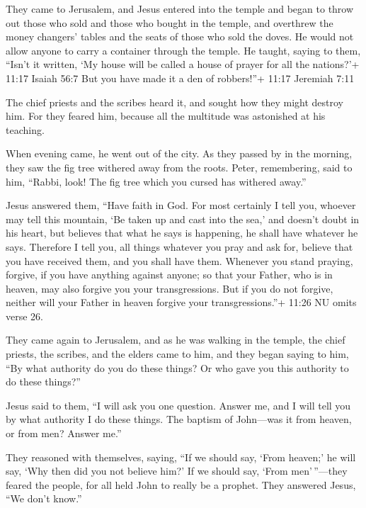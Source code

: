  They came to Jerusalem, and Jesus entered into the temple
and began to throw out those who sold and those who bought in the
temple, and overthrew the money changers' tables and the seats of those
who sold the doves.  He would not allow anyone to carry a
container through the temple.  He taught, saying to them,
``Isn't it written, `My house will be called a house of prayer for all
the nations?'+ 11:17 Isaiah 56:7 But you have made it a den of
robbers!''+ 11:17 Jeremiah 7:11

 The chief priests and the scribes heard it, and sought how
they might destroy him. For they feared him, because all the multitude
was astonished at his teaching.

 When evening came, he went out of the city. 
As they passed by in the morning, they saw the fig tree withered away
from the roots.  Peter, remembering, said to him, ``Rabbi,
look! The fig tree which you cursed has withered away.''

 Jesus answered them, ``Have faith in God. 
For most certainly I tell you, whoever may tell this mountain, `Be taken
up and cast into the sea,' and doesn't doubt in his heart, but believes
that what he says is happening, he shall have whatever he says.
 Therefore I tell you, all things whatever you pray and ask
for, believe that you have received them, and you shall have them.
 Whenever you stand praying, forgive, if you have anything
against anyone; so that your Father, who is in heaven, may also forgive
you your transgressions.  But if you do not forgive,
neither will your Father in heaven forgive your transgressions.''+ 11:26
NU omits verse 26.

 They came again to Jerusalem, and as he was walking in the
temple, the chief priests, the scribes, and the elders came to him,
 and they began saying to him, ``By what authority do you
do these things? Or who gave you this authority to do these things?''

 Jesus said to them, ``I will ask you one question. Answer
me, and I will tell you by what authority I do these things.
 The baptism of John---was it from heaven, or from men?
Answer me.''

 They reasoned with themselves, saying, ``If we should say,
`From heaven;' he will say, `Why then did you not believe him?'
 If we should say, `From men'\,''---they feared the people,
for all held John to really be a prophet.  They answered
Jesus, ``We don't know.''

